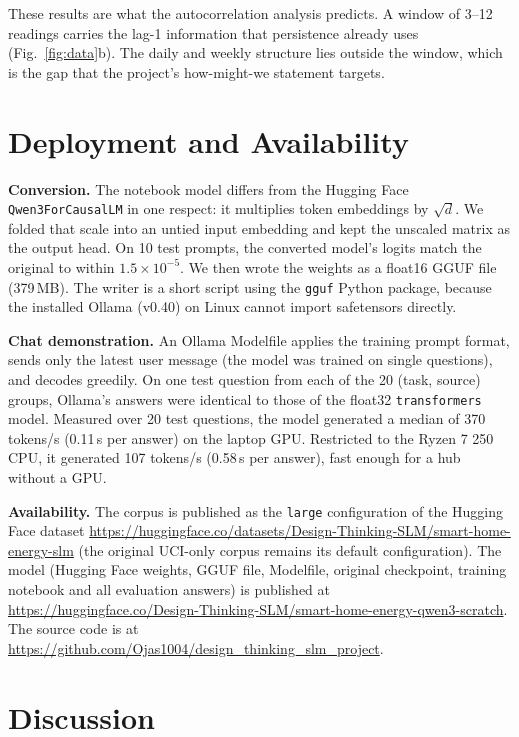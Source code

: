 \documentclass[conference]{IEEEtran}
\begin{document}
These results are what the autocorrelation analysis predicts. A window of 3--12 readings carries the lag-1
information that persistence already uses (Fig.~\ref{fig:data}b). The daily and weekly structure lies outside the
window, which is the gap that the project's how-might-we statement targets.

\section{Deployment and Availability}

\textbf{Conversion.} The notebook model differs from the Hugging Face \texttt{Qwen3ForCausalLM} in one respect: it
multiplies token embeddings by $\sqrt{d}$. We folded that scale into an untied input embedding and kept the unscaled
matrix as the output head. On 10 test prompts, the converted model's logits match the original to within
$1.5\times10^{-5}$. We then wrote the weights as a float16 GGUF file \cite{llamacpp} (379\,MB). The writer is a short
script using the \texttt{gguf} Python package, because the installed Ollama (v0.40) on Linux cannot import
safetensors directly.

\textbf{Chat demonstration.} An Ollama Modelfile \cite{ollama} applies the training prompt format, sends only the
latest user message (the model was trained on single questions), and decodes greedily. On one test question
from each of the 20 (task, source) groups, Ollama's answers were identical to those of the float32
\texttt{transformers} model. Measured over 20 test questions, the model generated a
median of 370 tokens/s (0.11\,s per answer) on the laptop GPU. Restricted to the Ryzen 7 250 CPU, it generated
107 tokens/s (0.58\,s per answer), fast enough for a hub without a GPU.

\textbf{Availability.} The corpus is published as the \texttt{large} configuration of the Hugging Face dataset
\url{https://huggingface.co/datasets/Design-Thinking-SLM/smart-home-energy-slm} (the original UCI-only corpus remains its default
configuration). The model (Hugging Face weights, GGUF file, Modelfile, original checkpoint, training notebook and all
evaluation answers) is published at \url{https://huggingface.co/Design-Thinking-SLM/smart-home-energy-qwen3-scratch}. The source code is
at \url{https://github.com/Ojas1004/design_thinking_slm_project}.

\section{Discussion}
\end{document}
